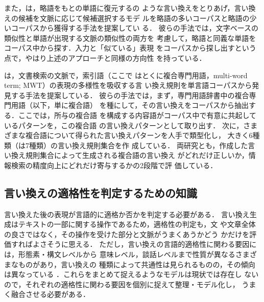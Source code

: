 また，は，略語をもとの単語に復元するの
ような言い換えをとりあげ，言い換えの候補を文脈に応じて候補選択するモデ
ルを略語の多いコーパスと略語の少いコーパスから獲得する手法を提案してい
る．
彼らの手法では，文字ベースの類似性と単語が出現する文脈の類似性の両方を
考慮して，略語と同義な単語をコーパス中から探す．入力と「似ている」表現
をコーパスから探し出すという点で，やはり上述のアプローチと同様の方向性
を持っている．

は，文書検索の文脈で，索引語（ここで
はとくに複合専門用語，multi-word term; MWT）の表現の多様性を吸収する言
い換え規則を単言語コーパスから発見する手法を提案している．
彼らの手法では，まず，専門用語辞書中の複合専門用語（以下，単に複合語）
を種にして，その言い換えをコーパスから抽出する．ここでは，所与の複合語
を構成する内容語がコーパス中で有意に共起しているパターンを，この複合語
の言い換えパターンとして取り出す．
次に，さまざまな複合語について得られた言い換えパターンを人手で類型化し，
大きく6種類（\citeauthor{yoshikane:03}は7種類）の言い換え規則集合を作
成している．
両研究とも，作成した言い換え規則集合によって生成される複合語の言い換え
がどれだけ正しいか，情報検索の精度向上にどれだけ寄与するかの2段階で評
価している．


\subsection{言い換えの適格性を判定するための知識}
\label{ssec:correctness}

言い換えた後の表現が言語的に適格か否かを判定する必要がある．
言い換え生成はテキストの一部に関する操作であるため，適格性の判定も，文
や文章全体の良さではなく，その操作を受けた部分と文脈がうまくあうかどう
かだけを評価すればよさそうに思える．
ただし，言い換えの言語的適格性に関わる要因には，形態素・構文レベルから
意味レベル，談話レベルまで性質が異なるさまざまなものがあり，言い換えの
種類によって共通性は見られるものの，その傾向は異なっている
\cite{fujita:03:c}．これらをまとめて捉えるようなモデルは現状では存在し
ないので，それぞれの適格性に関わる要因を個別に捉えて整理・モデル化し，
うまく融合させる必要がある．

